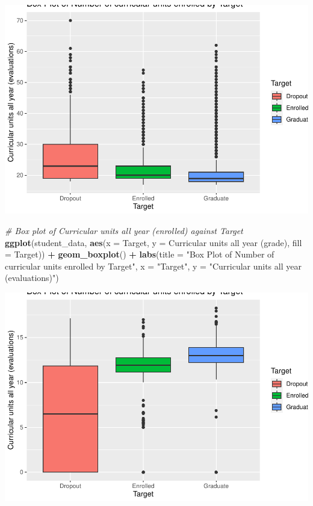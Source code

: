 \documentclass[
]{article}
\newenvironment{Shaded}{\begin{snugshade}}{\end{snugshade}}
\newcommand{\AttributeTok}[1]{\textcolor[rgb]{0.13,0.29,0.53}{#1}}
\newcommand{\CommentTok}[1]{\textcolor[rgb]{0.56,0.35,0.01}{\textit{#1}}}
\newcommand{\FunctionTok}[1]{\textcolor[rgb]{0.13,0.29,0.53}{\textbf{#1}}}
\newcommand{\NormalTok}[1]{#1}
\newcommand{\SpecialCharTok}[1]{\textcolor[rgb]{0.81,0.36,0.00}{\textbf{#1}}}
\newcommand{\StringTok}[1]{\textcolor[rgb]{0.31,0.60,0.02}{#1}}
\begin{document}
\includegraphics{exploratory_data_analysis_files/figure-latex/unnamed-chunk-20-1.pdf}

\begin{Shaded}
\begin{Highlighting}[]
\CommentTok{\# Box plot of Curricular units all year (enrolled) against \textquotesingle{}Target\textquotesingle{}}
\FunctionTok{ggplot}\NormalTok{(student\_data, }\FunctionTok{aes}\NormalTok{(}\AttributeTok{x =}\NormalTok{ Target, }\AttributeTok{y =} \StringTok{\textasciigrave{}}\AttributeTok{Curricular units all year (grade)}\StringTok{\textasciigrave{}}\NormalTok{, }\AttributeTok{fill =}\NormalTok{ Target)) }\SpecialCharTok{+} 
  \FunctionTok{geom\_boxplot}\NormalTok{() }\SpecialCharTok{+}
  \FunctionTok{labs}\NormalTok{(}\AttributeTok{title =} \StringTok{"Box Plot of Number of curricular units enrolled by Target"}\NormalTok{, }\AttributeTok{x =} \StringTok{"Target"}\NormalTok{, }\AttributeTok{y =} \StringTok{"Curricular units all year (evaluations)"}\NormalTok{)}
\end{Highlighting}
\end{Shaded}

\includegraphics{exploratory_data_analysis_files/figure-latex/unnamed-chunk-21-1.pdf}
\end{document}

